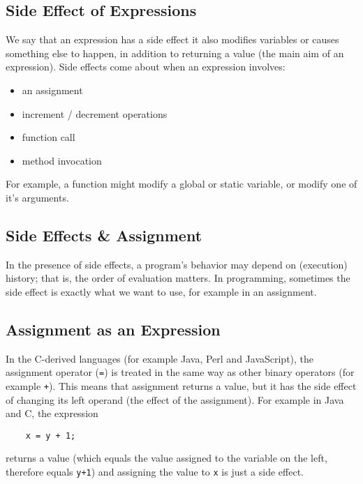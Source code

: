 \subsection{Side Effect of Expressions}
We say that an expression has a side effect it also modifies variables or causes something else to happen, in addition to returning a value (the main aim of an expression). Side effects come about when an expression involves:
\begin{itemize}
    \item an assignment
    \item increment / decrement operations
    \item function call
    \item method invocation
\end{itemize}

For example, a function might modify a global or static variable, or modify one of it's arguments. 

\subsection{Side Effects \& Assignment}
In the presence of side effects, a program's behavior may depend on (execution) history; that is, the order of evaluation matters. In programming, sometimes the side effect is exactly what we want to use, for example in an assignment.

\subsection{Assignment as an Expression}
In the C-derived languages (for example Java, Perl and JavaScript), the assignment operator (\verb|=|) is treated in the same way as other binary operators (for example \verb|+|). This means that assignment returns a value, but it has the side effect of changing its left operand (the effect of the assignment). For example in Java and C, the expression
\begin{verbatim}
    x = y + 1;
\end{verbatim}
returns a value (which equals the value assigned to the variable on the left, therefore equals \verb|y+1|) and assigning the value to \verb|x| is just a side effect. 

